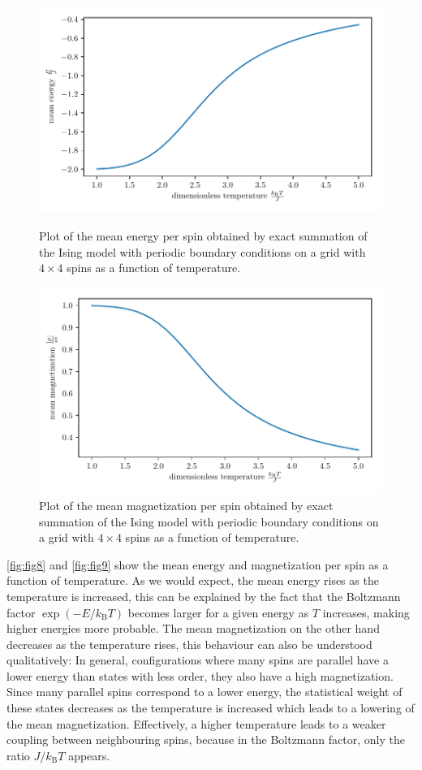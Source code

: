 \documentclass[a4paper,10pt,bibtotoc]{scrartcl}
\begin{document}
\begin{figure}[H]
	\centering
	\includegraphics[width=\linewidth]{energy_exact.pdf}
	\caption{Plot of the mean energy per spin obtained by exact summation of the Ising model with periodic boundary conditions on a grid with $4\times 4$ spins as a function of temperature.}
	\label{fig:fig8}
	\includegraphics[width=\linewidth]{magnetization_exact.pdf}
	\caption{Plot of the mean magnetization per spin obtained by exact summation of the Ising model with periodic boundary conditions on a grid with $4\times 4$ spins as a function of temperature.}
	\label{fig:fig9}
\end{figure}

\noindent\autoref{fig:fig8} and \autoref{fig:fig9} show the mean energy and magnetization per spin as a function of temperature.
As we would expect, the mean energy rises as the temperature is increased, this can be explained by the fact that the Boltzmann factor $\exp\left(-E/k_\mathrm{B}T\right)$ becomes larger for a given energy as $T$ increases, making higher energies more probable. 
The mean magnetization on the other hand decreases as the temperature rises, this behaviour can also be understood qualitatively:
In general, configurations where many spins are parallel have a lower energy than states with less order, they also have a high magnetization. 
Since many parallel spins correspond to a lower energy, the statistical weight of these states decreases as the temperature is increased which leads to a lowering of the mean magnetization.
Effectively, a higher temperature leads to a weaker coupling between neighbouring spins, because in the Boltzmann factor, only the ratio $J/k_\mathrm{B}T$ appears.
\end{document}
